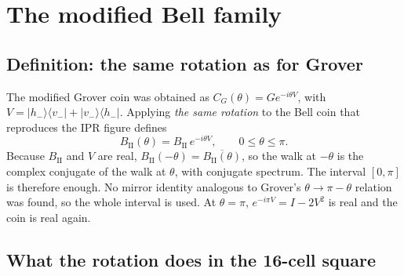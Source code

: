 \documentclass[11pt,a4paper,oneside]{report}
\newcommand{\ket}[1]{\lvert #1\rangle}
\newcommand{\bra}[1]{\langle #1\rvert}
\newcommand{\Id}{I}
\numberwithin{equation}{chapter}
\begin{document}
\section{The modified Bell family}
\label{sec:modbell}

\subsection{Definition: the same rotation as for Grover}

The modified Grover coin was obtained as \(C_G(\theta)=Ge^{-i\theta V}\),
with \(V=\ket{h_-}\bra{v_-}+\ket{v_-}\bra{h_-}\). Applying \emph{the same
rotation} to the Bell coin that reproduces the IPR figure defines
\begin{equation}
\boxed{B_{\mathrm{II}}(\theta)=B_{\mathrm{II}}\,e^{-i\theta V},\qquad
0\le\theta\le\pi.}
\end{equation}
Because \(B_{\mathrm{II}}\) and \(V\) are real,
\(B_{\mathrm{II}}(-\theta)=\overline{B_{\mathrm{II}}(\theta)}\), so the
walk at \(-\theta\) is the complex conjugate of the walk at \(\theta\),
with conjugate spectrum. The interval \([0,\pi]\) is therefore enough.
No mirror identity analogous to Grover's \(\theta\to\pi-\theta\) relation
was found, so the whole interval is used. At \(\theta=\pi\),
\(e^{-i\pi V}=\Id-2V^2\) is real and the coin is real again.

\subsection{What the rotation does in the 16-cell square}
\end{document}
